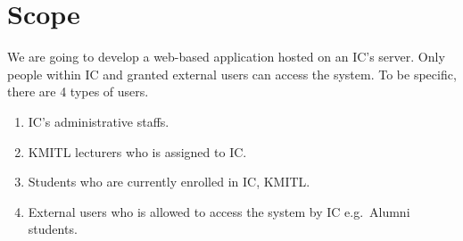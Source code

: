 \section{Scope}
We are going to develop a web-based application hosted on an IC's server.
Only people within IC and granted external users can access the system.
To be specific, there are 4 types of users.
\begin{enumerate}
\item IC's administrative staffs.
\item KMITL lecturers who is assigned to IC.
\item Students who are currently enrolled in IC, KMITL.
\item External users who is allowed to access the system by IC e.g.\ Alumni students.
\end{enumerate}

